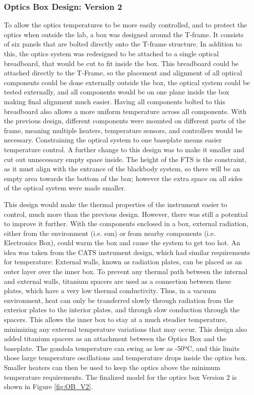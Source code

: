 \subsubsection{Optics Box Design: Version 2}
To allow the optics temperatures to be more easily controlled, and to protect the optics when outside the lab, a box was designed around the T-frame. It consists of six panels that are bolted directly onto the T-frame structure. In addition to this, the optics system was redesigned to be attached to a single optical breadboard, that would be cut to fit inside the box. This breadboard could be attached directly to the T-Frame, so the placement and alignment of all optical components could be done externally outside the box, the optical system could be tested externally, and all components would be on one plane inside the box making final alignment much easier. Having all components bolted to this breadboard also allows a more uniform temperature across all components. With the previous design, different components were mounted on different parts of the frame, meaning multiple heaters, temperature sensors, and controllers would be necessary. Constraining the optical system to one baseplate means easier temperature control. A further change to this design was to make it smaller and cut out unnecessary empty space inside. The height of the FTS is the constraint, as it must align with the entrance of the blackbody system, so there will be an empty area towards the bottom of the box; however the extra space on all sides of the optical system were made smaller. 

This design would make the thermal properties of the instrument easier to control, much more than the previous design. However, there was still a potential to improve it further.  With the components enclosed in a box, external radiation, either from the environment (i.e. sun) or from nearby components (i.e. Electronics Box), could warm the box and cause the system to get too hot. An idea was taken from the CATS instrument design, which had similar requirements for temperature: External walls, known as radiation plates, can be placed as an outer layer over the inner box. To prevent any thermal path between the internal and external walls, titanium spacers are used as a connection between these plates, which have a very low thermal conductivity. Thus, in a vacuum environment, heat can only be transferred slowly through radiation from the exterior plates to the interior plates, and through slow conduction through the spacers. This allows the inner box to stay at a much steadier temperature, minimizing any external temperature variations that may occur. This design also added titanium spacers as an attachment between the Optics Box and the baseplate. The gondola temperature can swing as low as -50ºC, and this limits those large temperature oscillations and temperature drops inside the optics box. Smaller heaters can then be used to keep the optics above the minimum temperature requirements. The finalized model for the optics box Version 2 is shown in Figure \ref{fig:OB_V2}.

